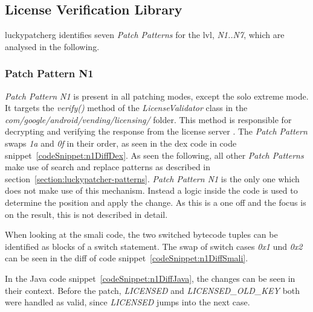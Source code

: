 \subsection{License Verification Library}
\gls{luckypatcherg} identifies seven \textit{Patch Patterns} for the \gls{lvl}, \textit{N1..N7}, which are analysed in the following.

\subsubsection{Patch Pattern N1}
\textit{Patch Pattern N1} is present in all patching modes, except the solo extreme mode.
It targets the \textit{verify()} method of the \textit{LicenseValidator} class in the \textit{com/google/android/vending/licensing/} folder.
This method is responsible for decrypting and verifying the response from the license server \cite{developersLicensingReference}.
\newline
The \textit{Patch Pattern} swaps \textit{1a} and \textit{0f} in their order, as seen in the dex code in code snippet~\ref{codeSnippet:n1DiffDex}.
\newline
As seen the following, all other \textit{Patch Patterns} make use of search and replace patterns as described in section~\ref{section:luckypatcher-patterns}.
\textit{Patch Pattern N1} is the only one which does not make use of this mechanism.
Instead a logic inside the code is used to determine the position and apply the change.
As this is a one off and the focus is on the result, this is not described in detail.
\newline

When looking at the smali code, the two switched bytecode tuples can be identified as blocks of a switch statement.
The swap of switch cases \textit{0x1} und \textit{0x2} can be seen in the diff of code snippet~\ref{codeSnippet:n1DiffSmali}.
\newline

In the Java code snippet~\ref{codeSnippet:n1DiffJava}, the changes can be seen in their context.
Before the patch, \textit{LICENSED} and \textit{LICENSED\_OLD\_KEY} both were handled as valid, since \textit{LICENSED} jumps into the next case.
